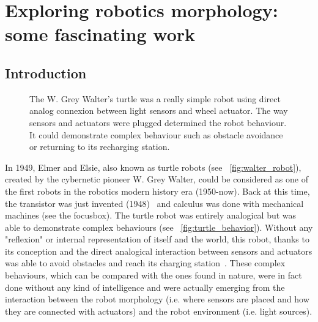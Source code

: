 
% 

\chapter{Exploring robotics morphology: some fascinating work} %
\label{cha:morphology-review}


\section{Introduction} %

\begin{figure}[!b]
\centering
    \hfil
    \caption{The W. Grey Walter's turtle was a really simple robot using direct analog connexion between light sensors and wheel actuator. The way sensors and actuators were plugged determined the robot behaviour. It could demonstrate complex behaviour such as obstacle avoidance or returning to its recharging station.}
    \label{fig:turtle_robot}
\end{figure}


In 1949, Elmer and Elsie, also known as turtle robots (see \figurename~\ref{fig:walter_robot}), created by the cybernetic pioneer W. Grey Walter, could be considered as one of the first robots in the robotics modern history era (1950-now). Back at this time, the transistor was just invented (1948)~\cite{brinkman1997history} and calculus was done with mechanical machines (see the focusbox). The turtle robot was entirely analogical but was able to demonstrate complex behaviours (see \figurename~\ref{fig:turtle_behavior}). Without any "reflexion" or internal representation of itself and the world, this robot, thanks to its conception and the direct analogical interaction between sensors and actuators was able to avoid obstacles and reach its charging station~\cite{walter1950imitation}.
These complex behaviours, which can be compared with the ones found in nature, were in fact done without any kind of intelligence and were actually emerging from the interaction between the robot morphology (i.e. where sensors are placed and how they are connected with actuators) and the robot environment (i.e. light sources).


